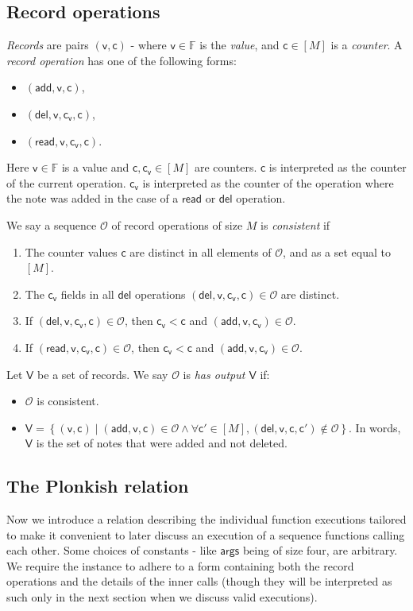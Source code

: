 \documentclass[11pt]{article} %
\newcommand{\F}{\ensuremath{\mathbb F}\xspace}
\newcommand{\set}[1]{\ensuremath{\left\{#1\right\}}\xspace}
\renewcommand{\c}{\ensuremath{\mathsf{c}}\xspace}
\newcommand{\vc}{\ensuremath{\mathsf{c_v}}\xspace}
\renewcommand{\v}{\ensuremath{\mathsf{v}}\xspace}
\newcommand{\add}{\ensuremath{\mathsf{add}}\xspace}
\newcommand{\del}{\ensuremath{\mathsf{del}}\xspace}
\renewcommand{\read}{\ensuremath{\mathsf{read}}\xspace}
\newcommand{\countrange}{\ensuremath{[M]}\xspace}
\newcommand{\ops}{\ensuremath{\mathcal{O}}\xspace}
\newcommand{\args}{\ensuremath{\mathsf{args}}\xspace}
\newcommand{\recset}{\ensuremath{\mathsf{V}}\xspace}
\begin{document}
\subsection{Record operations}
\emph{Records} are pairs $(\v,\c)$ - where $\v\in \F$ is the \emph{value}, and $\c\in \countrange$ is a \emph{counter}.
A \emph{record operation} has one of the following forms:
\begin{itemize}
 \item $(\add,\v,\c)$,
\item $(\del,\v,\vc,\c)$,
\item $(\read,\v,\vc,\c)$.

\end{itemize}
Here $\v\in \F$ is a value and $\c,\vc \in \countrange$ are counters.
$\c$ is interpreted as the counter of the current operation. $\vc$
  is interpreted as the counter of the operation where
the note was added in the case of a \read or \del operation.



We say a sequence \ops of record operations of size $M$ is \emph{consistent} if
\begin{enumerate}
\item The counter values $\c$ are distinct in all elements of \ops, and as a set equal to \countrange.
\item The $\vc$ fields in all $\del$ operations $(\del,\v,\vc,\c)\in \ops$ are distinct.
\item If $(\del,\v,\vc,\c)\in \ops$, then $\vc<\c$ and $(\add,\v,\vc)\in \ops$.
\item If $(\read,\v,\vc,\c)\in \ops$, then $\vc<\c$ and $(\add,\v,\vc)\in \ops$.
\end{enumerate}

Let \recset be a set of records.
We say $\ops$ is \emph{has output \recset} if:
\begin{itemize}
 \item $\ops$ is consistent.
 \item $\recset=\set{(\v,\c) \mid (\add,\v,\c)\in \ops \land \forall \c'\in \countrange,(\del,\v,\c,\c')\notin \ops }$. In words,
 \recset is the set of notes that were added and not deleted.
\end{itemize}



\subsection{The Plonkish relation}
Now we introduce a relation describing the individual function executions tailored to make it convenient to later discuss an execution of a  sequence functions calling each other.
Some choices of constants - like \args being of size four, are arbitrary.
We require the instance to adhere to a form containing both the record operations and the details of the inner calls (though they will be interpreted as such only in the next section when we discuss valid executions).
\end{document}
